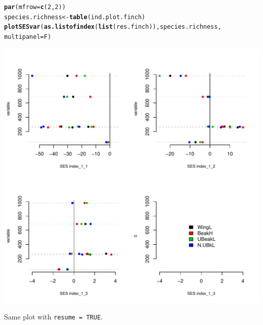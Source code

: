 \documentclass[12pt]{article}\usepackage[]{graphicx}\usepackage[]{color}
\makeatletter
\def\maxwidth{ %
  \ifdim\Gin@nat@width>\linewidth
    \linewidth
  \else
    \Gin@nat@width
  \fi
}
\newcommand{\hlnum}[1]{\textcolor[rgb]{0.686,0.059,0.569}{#1}}%
\newcommand{\hlstd}[1]{\textcolor[rgb]{0.345,0.345,0.345}{#1}}%
\newcommand{\hlkwb}[1]{\textcolor[rgb]{0.69,0.353,0.396}{#1}}%
\newcommand{\hlkwc}[1]{\textcolor[rgb]{0.333,0.667,0.333}{#1}}%
\newcommand{\hlkwd}[1]{\textcolor[rgb]{0.737,0.353,0.396}{\textbf{#1}}}%
\newenvironment{kframe}{%
 \def\at@end@of@kframe{}%
 \ifinner\ifhmode%
  \def\at@end@of@kframe{\end{minipage}}%
  \begin{minipage}{\columnwidth}%
 \fi\fi%
 \def\FrameCommand##1{\hskip\@totalleftmargin \hskip-\fboxsep
 \colorbox{shadecolor}{##1}\hskip-\fboxsep
     \hskip-\linewidth \hskip-\@totalleftmargin \hskip\columnwidth}%
 \MakeFramed {\advance\hsize-\width
   \@totalleftmargin\z@ \linewidth\hsize
   \@setminipage}}%
 {\par\unskip\endMakeFramed%
 \at@end@of@kframe}
\newenvironment{knitrout}{}{} %
\makeatother
\begin{document}
\begin{knitrout}
\color{fgcolor}\begin{kframe}
\begin{alltt}
\hlkwd{par}\hlstd{(}\hlkwc{mfrow} \hlstd{=} \hlkwd{c}\hlstd{(}\hlnum{2}\hlstd{,}\hlnum{2}\hlstd{))}
\hlstd{species.richness}\hlkwb{<-}\hlkwd{table}\hlstd{(ind.plot.finch)}
\hlkwd{plotSESvar}\hlstd{(}\hlkwd{as.listofindex}\hlstd{(}\hlkwd{list}\hlstd{(res.finch)), species.richness,}
       \hlkwc{multipanel} \hlstd{= F)}
\end{alltt}
\end{kframe}
\includegraphics[width=\maxwidth]{figure/unnamed-chunk-40} 

\end{knitrout}

Same plot with \texttt{resume = TRUE}.
\end{document}
